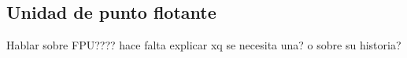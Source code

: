 \documentclass[a4paper]{article}
\begin{document}
\subsection{Unidad de punto flotante}
Hablar sobre  FPU???? hace falta explicar xq se necesita una? o sobre su historia?


\end{document}
